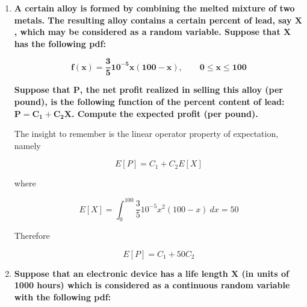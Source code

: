 \documentclass[10pt, oneside]{article}
\begin{document}
\begin{enumerate}[label=7.\arabic*]
By uniform distribution, $f(T) = \frac{1}{150}$ on $150 \leq T \leq 300$. If naphtha is produced, then the net profit is given by $NP = C_2 - C_1$, and if refined oil distillate is produced, then the net profit is $NP = C_3 - C_1$. The probabilities of producing naphtha, and consequently of each respective net profit, is

\begin{align*}
P(T < 200) &= \int^{200}_{150} \frac{1}{150} \ dT = \frac{1}{3} = P(C_2 - C_1) \\
P(T \geq 200) &= \int^{300}_{200} \frac{1}{150} \ dT = \frac{2}{3} = P(C_3 - C_1) 
\end{align*}

Therefore, the expectation of the net profit per gallon is

\begin{align*}
E[NP] &= (C_2 - C_1) P(C_2 - C_1) + (C_3 - C_1) P(C_3 - C_1) \\
&= \boxed{\frac{C_2 + 2 C_3 - 3 C_1}{3}}
\end{align*}

\item  \begin{tcolorbox}[
  colback=Cerulean!5!white,
  colframe=Cerulean!75!black]
\textbf{A certain alloy is formed by combining the melted mixture of two metals. The resulting alloy contains a certain percent of lead, say $\bm{X}$, which may be considered as a random variable. Suppose that $\bm{X}$ has the following pdf:}

\[ \bm{f(x) = \frac{3}{5} 10^{-5} x (100-x), \qquad 0 \leq x \leq 100} \]

\textbf{Suppose that $\bm{P}$, the net profit realized in selling this alloy (per pound), is the following function of the percent content of lead: $\bm{P = C_1 + C_2 X}$. Compute the expected profit (per pound).}
\end{tcolorbox}

The insight to remember is the linear operator property of expectation, namely

\[ E[P] = C_1 + C_2 E[X] \]

where

\[ E[X] = \int^{100}_0 \frac{3}{5} 10^{-5} x^2 (100-x) \ dx = 50 \]

Therefore

\[E[P] = \boxed{C_1 + 50 C_2} \]

\item  \begin{tcolorbox}[
  colback=Cerulean!5!white,
  colframe=Cerulean!75!black]
\textbf{Suppose that an electronic device has a life length $\bm{X}$ (in units of 1000 hours) which is considered as a continuous random variable with the following pdf:}


\end{tcolorbox}
\end{enumerate}
\end{document}
